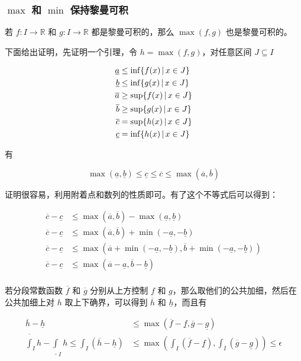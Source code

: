 \subsubsection{$\max$ 和 $\min$ 保持黎曼可积}

若 $f: I \to \mathbb{R}$ 和 $g: I \to \mathbb{R}$ 都是黎曼可积的，那么 $\max(f,g)$ 也是黎曼可积的。

下面给出证明，先证明一个引理，令 $h = \max(f,g)$，对任意区间 $J \subseteq I $

\begin{align*}
\underline{a} & \le \inf \{ f(x) \,\vert\, x \in J \} \\
\underline{b} & \le \inf \{ g(x) \,\vert\, x \in J \} \\
\overline{a} & \ge \sup \{ f(x) \,\vert\, x \in J \} \\
\overline{b} & \ge \sup \{ g(x) \,\vert\, x \in J \} \\
\overline{c} & = \sup \{ h(x) \,\vert\, x \in J \} \\
\underline{c} & = \inf \{ h(x) \,\vert\, x \in J \} \\
\end{align*}

有

\[
  \max (\underline{a},\underline{b})  \le \underline{c} \le \overline{c} \le \max (\overline{a},\overline{b})
\]

证明很容易，利用附着点和数列的性质即可。有了这个不等式后可以得到：

\begin{align*}
  \overline{c} - \underline{c} & \le \max(\overline{a}, \overline{b}) - \max(\underline{a}, \underline{b}) \\
  \overline{c} - \underline{c} & \le \max(\overline{a}, \overline{b}) + \min(-\underline{a}, -\underline{b}) \\
  \overline{c} - \underline{c} & \le \max(\overline{a} + \min(-\underline{a}, -\underline{b}), \overline{b} + \min(-\underline{a}, -\underline{b})) \\
  \overline{c} - \underline{c} & \le \max(\overline{a} -\underline{a}, \overline{b} -\underline{b}) \\
\end{align*}

若分段常数函数 $\overline{f}$ 和 $\overline{g}$ 分别从上方控制 $f$ 和 $g$，那么取他们的公共加细，然后在公共加细上对 $h$ 取上下确界，可以得到 $\overline{h}$ 和 $\underline{h}$，而且有

\begin{align*}
    \overline{h} - \underline{h} & \le \max(\overline{f} - \underline{f}, \overline{g} - \underline{g}) \\
    \overline{\int}_I h - \underline{\int}_I h \le \int_{I}(\overline{h} - \underline{h}) & \le \max (\int_{I}(\overline{f} - \underline{f}),\int_{I}(\overline{g} - \underline{g}) ) \le \epsilon
\end{align*}

